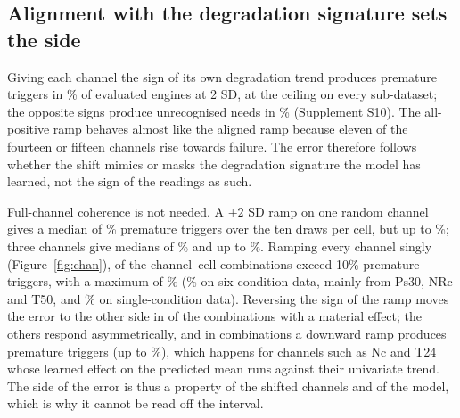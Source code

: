 \documentclass[11pt,a4paper]{article}
\begin{document}
\begin{table}[!t]
\caption{Stress test in within-condition SD units, heteroscedastic head, $L=20$, one-sided 95\% bound. PICP: central 90\% coverage; one-sided: share of engines with true RUL above the lower bound; $f_{\mathrm{oob}}$: \% of normalised sensor inputs outside $[-1,1]$. Rates are \% of evaluated engines with engine-bootstrap 95\% intervals (2000 resamples, conditional on the five models). An interval of $[0.0, 0.0]$ means that no engine showed the event; see Section~\ref{sec:framework} for the exact upper bound. All mechanisms, lead times and shift sizes: supplementary CSV files.}
\label{tab:sd}
\centering\scriptsize

\end{table}

\subsection{Alignment with the degradation signature sets the side}\label{sec:align}
Giving each channel the sign of its own degradation trend produces premature triggers in \RVPremAligned\% of evaluated engines at 2 SD, at the ceiling on every sub-dataset; the opposite signs produce unrecognised needs in \RVLateAnti\% (Supplement S10). The all-positive ramp behaves almost like the aligned ramp because eleven of the fourteen or fifteen channels rise towards failure. The error therefore follows whether the shift mimics or masks the degradation signature the model has learned, not the sign of the readings as such.

Full-channel coherence is not needed. A $+2$ SD ramp on one random channel gives a median of \RVKOneMed\% premature triggers over the ten draws per cell, but up to \RVKOneMax\%; three channels give medians of \RVKThreeMed\% and up to \RVKThreeMax\%. Ramping every channel singly (Figure~\ref{fig:chan}), \RVChanGtTen{} of the \RVChanN{} channel--cell combinations exceed 10\% premature triggers, with a maximum of \RVChanMax\% (\RVChanMaxSixCond\% on six-condition data, mainly from Ps30, NRc and T50, and \RVChanMaxSingleCond\% on single-condition data). Reversing the sign of the ramp moves the error to the other side in \RVChanFlip{} of the \RVChanMaterial{} combinations with a material effect; the others respond asymmetrically, and in \RVChanNegPremN{} combinations a downward ramp produces premature triggers (up to \RVChanNegPremMax\%), which happens for channels such as Nc and T24 whose learned effect on the predicted mean runs against their univariate trend. The side of the error is thus a property of the shifted channels and of the model, which is why it cannot be read off the interval.
\end{document}

